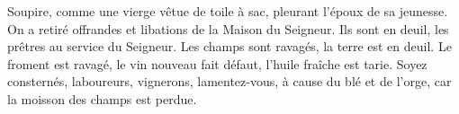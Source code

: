 Soupire, comme une vierge vêtue de toile à sac, pleurant l’époux de sa jeunesse.
On a retiré offrandes et libations de la Maison du Seigneur.
	Ils sont en deuil, les prêtres au service du Seigneur.
Les champs sont ravagés, la terre est en deuil.
	Le froment est ravagé, le vin nouveau fait défaut, l’huile fraîche est tarie.
Soyez consternés, laboureurs, vignerons,
	lamentez-vous, à cause du blé et de l’orge, car la moisson des champs est perdue.

